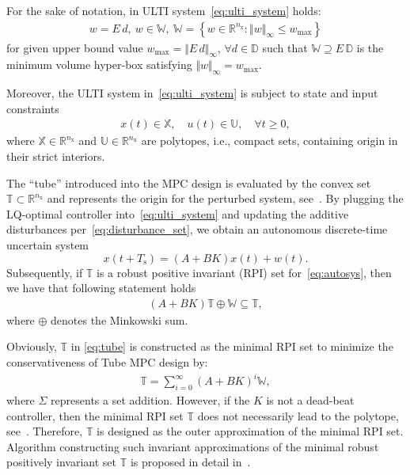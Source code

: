 \documentclass[letterpaper, 10 pt, conference]{ieeeconf}
\begin{document}
For the sake of notation, in ULTI system~\eqref{eq:ulti_system} holds:
\begin{eqnarray}
	\label{eq:disturbance_set}
	w = E \, d, ~ w \in \mathbb{W}, ~ \mathbb{W} = \left\{ w \in \mathbb{R}^{n_{\mathrm{x}}} : \Vert w \Vert_{\infty} \leq w_{\max} \right\}
\end{eqnarray}
for given upper bound value $w_{\max} = \Vert E \, d \Vert_{\infty}$, $\forall d \in \mathbb{D}$ such that $\mathbb{W} \supseteq E \, \mathbb{D}$ is the minimum volume hyper-box satisfying $\Vert w \Vert_{\infty} = w_{\max}$.

Moreover, the ULTI system in~\eqref{eq:ulti_system} is subject to state and input constraints
\begin{eqnarray}
	\label{eq:constraints_x_u}
	x(t) \in \mathbb{X}, \quad u(t) \in \mathbb{U}, \quad \forall t \geq 0,
\end{eqnarray}
where $\mathbb{X} \in \mathbb{R}^{n_{\mathrm{x}}}$ and $\mathbb{U} \in \mathbb{R}^{n_{\mathrm{u}}}$ are polytopes, i.e., compact sets, containing origin in their strict interiors. 

The ``tube'' introduced into the MPC design is evaluated by the convex set $\mathbb{T} \subset \mathbb{R}^{n_{\mathrm{x}}}$ and represents the origin for the perturbed system, see~\cite{MS05}. 
%
By plugging the LQ-optimal controller into~\eqref{eq:ulti_system} and updating the additive disturbances per~\eqref{eq:disturbance_set}, we obtain an autonomous discrete-time uncertain system 
\begin{equation}
	\label{eq:autosys}
	x(t+T_{\mathrm{s}}) = (A + BK)x(t) + w(t).
\end{equation}
Subsequently, if $\mathbb{T}$ is a robust positive invariant (RPI) set for~\eqref{eq:autosys}, then we have that following statement holds 
\begin{eqnarray}
	\label{eq:tube}
	\left( A + B K \right) \mathbb{T} \oplus \mathbb{W} \subseteq \mathbb{T},
\end{eqnarray}
where $\oplus$ denotes the Minkowski sum.

Obviously, $\mathbb{T}$ in \eqref{eq:tube} is constructed as the minimal RPI set to minimize the conservativeness of Tube MPC design by:
\begin{eqnarray}
	\label{eq:tube_design}
	\mathbb{T} = \sum_{i=0}^{\infty} \left( A + B K \right)^{i} \mathbb{W},
\end{eqnarray}
where $\Sigma$ represents a set addition. However, if the $K$ is not a dead-beat controller, then the minimal RPI set $\mathbb{T}$ does not necessarily lead to the polytope, see~\cite{MS05}. Therefore, $\mathbb{T}$ is designed as the outer approximation of the minimal RPI set.  Algorithm constructing such invariant approximations of the minimal robust positively invariant set $\mathbb{T}$ is proposed in detail in~\cite{RK05}.
\end{document}
